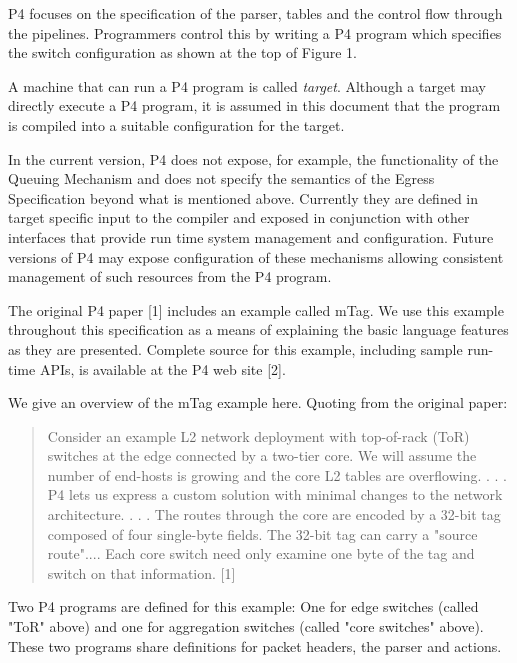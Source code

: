 \documentclass[12pt]{article}
\begin{document}
P4 focuses on the specification of the parser, \matchaction tables and the
control flow through the pipelines. Programmers control this by writing a
P4 program which specifies the switch configuration as shown at the top of
Figure 1.

A machine that can run a P4 program is called \textit{target}. Although a target
may directly execute a P4 program, it is assumed in this document that the
program is compiled into a suitable configuration for the target.

In the current version, P4 does not expose, for example, the functionality
of the Queuing Mechanism and does not specify the semantics of the Egress
Specification beyond what is mentioned above. Currently they are defined in
target specific input to the compiler and exposed in conjunction with other
interfaces that provide run time system management and configuration. Future
versions of P4 may expose configuration of these mechanisms allowing consistent
management of such resources from the P4 program.


The original P4 paper [1] includes an example called mTag. We use this example
throughout this specification as a means of explaining the basic language
features as they are presented. Complete source for this example, including
sample run-time APIs, is available at the P4 web site [2].

We give an overview of the mTag example here.  Quoting from the original paper:

\begin{quote}
Consider an example L2 network deployment with top-of-rack (ToR) switches
at the edge connected by a two-tier core. We will assume the number of end-hosts
is growing and the core L2 tables are overflowing. . . .  P4 lets us express a
custom solution with minimal changes to the network architecture. . . . The routes
through the core are encoded by a 32-bit tag composed of four single-byte
fields.  The 32-bit tag can carry a "source route".... Each core switch need
only examine one byte of the tag and switch on that information. [1]
\end{quote}

Two P4 programs are defined for this example: One for edge switches (called
"ToR" above) and one for aggregation switches (called "core switches" above).
These two programs share definitions for packet headers, the parser and actions.

\end{document}
